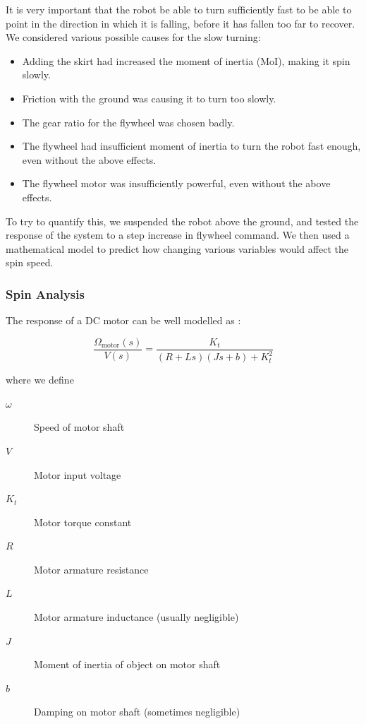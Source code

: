 \documentclass{IIBproject}
\begin{document}
It is very important that the robot be able to turn sufficiently fast to be
able to point in the direction in which it is falling, before it has fallen
too far to recover.  We considered various possible causes for the slow
turning:

\begin{itemize}
  \item Adding the skirt had increased the moment of inertia (MoI), making it
    spin slowly.
  \item Friction with the ground was causing it to turn too slowly.
  \item The gear ratio for the flywheel was chosen badly.
  \item The flywheel had insufficient moment of inertia to turn the robot fast
    enough, even without the above effects.
  \item The flywheel motor was insufficiently powerful, even without the above
    effects.
    \end{itemize}

To try to quantify this, we suspended the robot above the ground, and tested
the response of the system to a step increase in flywheel command. We then
used a mathematical model to predict how changing various variables would
affect the spin speed.

\subsubsection{Spin Analysis}

The response of a DC motor can be well modelled as \cite{ref:6302}:

\begin{equation*}
  \frac{\Omega_\textrm{motor}(s)}{V(s)} = \frac{K_t}{(R+Ls)(Js+b)+K_t^2}
  \end{equation*}

where we define

\begin{description}
  \item[$\omega$] Speed of motor shaft
  \item[$V$] Motor input voltage
  \item[$K_t$] Motor torque constant
  \item[$R$] Motor armature resistance
  \item[$L$] Motor armature inductance (usually negligible)
  \item[$J$] Moment of inertia of object on motor shaft
  \item[$b$] Damping on motor shaft (sometimes negligible)
    \end{description}
\end{document}

